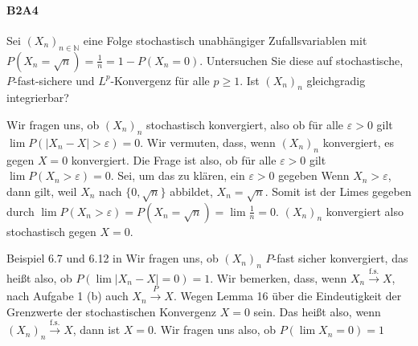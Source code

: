 \documentclass{article}
\begin{document}
\paragraph{B2A4}
Sei $(X_n)_{n\in\mathbb{N}}$ eine Folge stochastisch unabhängiger Zufallsvariablen mit $P(X_n=\sqrt{n})=\frac{1}{n}=1-P(X_n=0)$.
Untersuchen Sie diese auf stochastische, $P$-fast-sichere und $L^p$-Konvergenz für alle $p\geq1$.
Ist $(X_n)_n$ gleichgradig integrierbar?

Wir fragen uns, ob $(X_n)_n$ stochastisch konvergiert, also ob für alle $\varepsilon>0$ gilt $\lim P(|X_n-X|>\varepsilon)=0$.
Wir vermuten, dass, wenn $(X_n)_n$ konvergiert, es gegen $X=0$ konvergiert.
Die Frage ist also, ob für alle $\varepsilon>0$ gilt $\lim P(X_n>\varepsilon)=0$.
Sei, um das zu klären, ein $\varepsilon>0$ gegeben
Wenn $X_n>\varepsilon$, dann gilt, weil $X_n$ nach $\{0,\sqrt{n}\}$ abbildet, $X_n=\sqrt{n}$.
Somit ist der Limes gegeben durch $\lim P(X_n>\varepsilon)=P(X_n=\sqrt{n})=\lim\frac{1}{n}=0$.
$(X_n)_n$ konvergiert also stochastisch gegen $X=0$.

Beispiel 6.7 und 6.12 in \cite{Hesse}
Wir fragen uns, ob $(X_n)_n$ $P$-fast sicher konvergiert, das heißt also, ob $P(\lim |X_n-X|=0)=1$.
Wir bemerken, dass, wenn $X_n\xrightarrow{\text{f.s.}}X$, nach Aufgabe 1 (b) auch $X_n\xrightarrow{P}X$.
Wegen Lemma 16 über die Eindeutigkeit der Grenzwerte der stochastischen Konvergenz $X=0$ sein.
Das heißt also, wenn $(X_n)_n\xrightarrow{\text{f.s.}}X$, dann ist $X=0$.
Wir fragen uns also, ob $P(\lim X_n=0)=1$
\newpage

\end{document}
